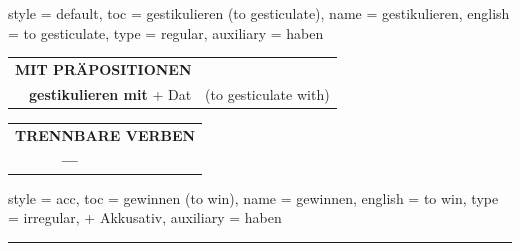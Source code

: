 \begin{verbentry}{
  style = {default},
  toc = {gestikulieren (to gesticulate)},
  name = {gestikulieren},
  english = {to gesticulate},
  type = {regular},
  auxiliary = {haben}
}
\vspace{10pt}

\begin{tabular}{lll}
\multicolumn{3}{l}{\textbf{MIT PRÄPOSITIONEN}}\\
& \textbf{gestikulieren mit} + Dat & (to gesticulate with)\\
\end{tabular}
\hfill
\begin{tabular}{lll}
\multicolumn{3}{l}{\textbf{TRENNBARE VERBEN}}\\
& \textbf{---} & \\
\end{tabular}
\vspace{-5pt}
\end{verbentry}

\begin{verbentry}{
  style = {acc},
  toc = {gewinnen (to win)},
  name = {gewinnen},
  english = {to win},
  type = {irregular, + Akkusativ},
  auxiliary = {haben}
}
 
    
     \vspace{5pt}

    \hrule
    
    \vspace{5pt}


\end{verbentry}
